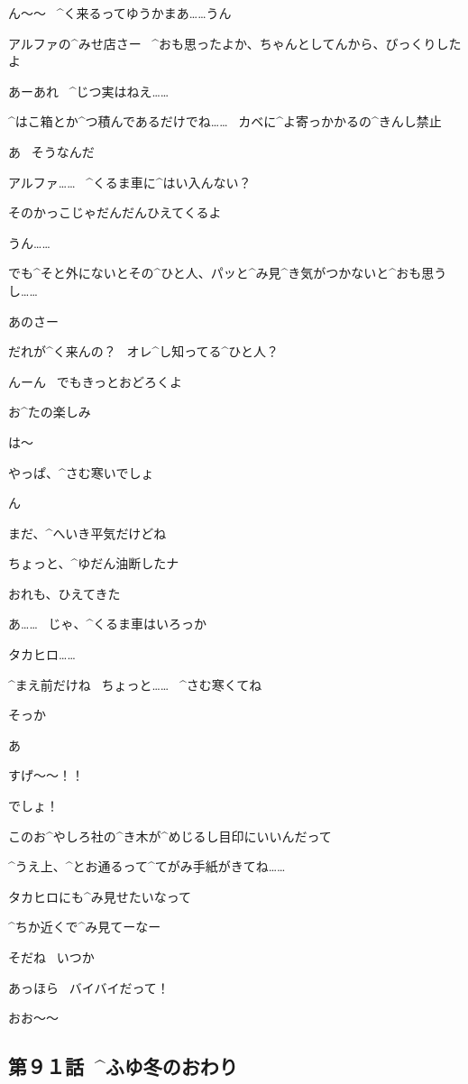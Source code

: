 \A ん〜〜
\ ^{く}{来}るってゆうかまあ……うん

\page
\T アルファの^{みせ}{店}さー
\ ^{おも}{思}ったよか、ちゃんとしてんから、びっくりしたよ

\A あーあれ
\ ^{じつ}{実}はねえ……

\A ^{はこ}{箱}とか^{つ}{積}んであるだけでね……
\ カベに^{よ}{寄}っかかるの^{きんし}{禁止}

\T あ
\ そうなんだ

\page
\T アルファ……
\ ^{くるま}{車}に^{はい}{入}んない？

\T そのかっこじゃだんだんひえてくるよ

\A うん……

\A でも^{そと}{外}にないとその^{ひと}{人}、パッと^{み}{見}^{き}{気}がつかないと^{おも}{思}うし……

\T あのさー

\T だれが^{く}{来}んの？
\ オレ^{し}{知}ってる^{ひと}{人}？

\A んーん
\ でもきっとおどろくよ

\A お^{たの}{楽}しみ

\page
\A は〜

\T やっぱ、^{さむ}{寒}いでしょ

\A ん

\A まだ、^{へいき}{平気}だけどね

\A ちょっと、^{ゆだん}{油断}したナ

\T おれも、ひえてきた

\A あ……
\ じゃ、^{くるま}{車}はいろっか

\page
\A タカヒロ……

\page
\T ^{まえ}{前}だけね
\ ちょっと……
\ ^{さむ}{寒}くてね

\A そっか

\page
\A あ

\page[32]
\T すげ〜〜！！

\A でしょ！

\page
\A このお^{やしろ}{社}の^{き}{木}が^{めじるし}{目印}にいいんだって

\A ^{うえ}{上}、^{とお}{通}るって^{てがみ}{手紙}がきてね……

\A タカヒロにも^{み}{見}せたいなって

\T ^{ちか}{近}くで^{み}{見}てーなー

\A そだね
\ いつか

\page
\A あっほら
\ バイバイだって！

\T おお〜〜


\subsection{第９１話\ ^{ふゆ}{冬}のおわり}

